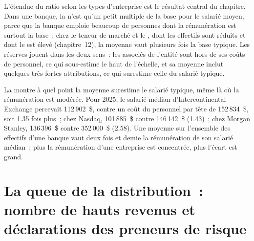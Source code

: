 L'étendue du ratio selon les types d'entreprise est le résultat central du chapitre. Dans une banque, la  n'est qu'un petit multiple de la base
pour le salarié moyen, parce que la banque emploie beaucoup de personnes dont la rémunération est surtout la base~; chez le teneur de marché et le
, dont les effectifs sont réduits et dont le  est élevé (chapitre~12), la moyenne vaut plusieurs fois la base typique.
Les réserves jouent dans les deux sens~: les associés de l'entité sont hors de ses coûts de personnel, ce qui sous-estime le haut de l'échelle,
et sa moyenne inclut quelques très fortes attributions, ce qui surestime celle du salarié typique.

La  montre à quel point la moyenne surestime le salarié typique, même là où la rémunération est modérée. Pour 2025, le
salarié médian d'Intercontinental Exchange percevait 112\,902~\$, contre un coût du personnel par tête de 152\,834~\$, soit 1.35 fois plus~;
chez Nasdaq, 101\,885~\$ contre 146\,142~\$ (1.43)~; chez Morgan Stanley, 136\,396~\$ contre 352\,000~\$ (2.58). Une moyenne sur l'ensemble des effectifs d'une
banque vaut deux fois et demie la rémunération de son salarié médian~; plus la rémunération d'une entreprise est concentrée,
plus l'écart est grand.

\section{La queue de la distribution~: nombre de hauts revenus et déclarations des preneurs de risque}

